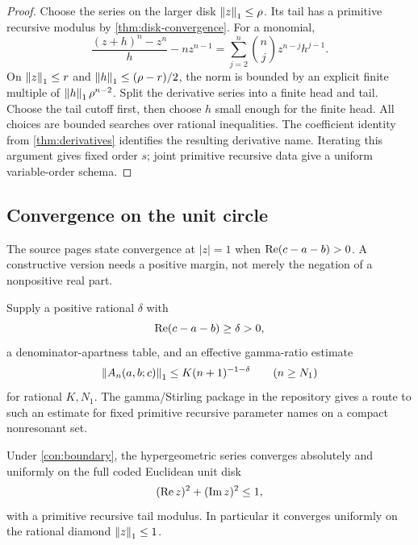 \begin{proof}
Choose the series on the larger disk \(\left\lVert z\right\rVert_1\le\rho\).  Its tail has a
primitive recursive modulus by \cref{thm:disk-convergence}.  For a monomial,
\[
 \frac{(z+h)^n-z^n}{h}-nz^{n-1}
 =\sum_{j=2}^{n}\binom nj z^{n-j}h^{j-1}.
\]
On \(\left\lVert z\right\rVert_1\le r\) and \(\left\lVert h\right\rVert_1\le(\rho-r)/2\), the norm is bounded by an
explicit finite multiple of \(\left\lVert h\right\rVert_1\rho^{n-2}\).  Split the derivative
series into a finite head and tail.  Choose the tail cutoff first, then choose
\(h\) small enough for the finite head.  All choices are bounded searches over
rational inequalities.  The coefficient identity from
\cref{thm:derivatives} identifies the resulting derivative name.  Iterating
this argument gives fixed order \(s\); joint primitive recursive data give a
uniform variable-order schema.
\end{proof}

\subsection{Convergence on the unit circle}

The source pages state convergence at \(|z|=1\) when
\(\operatorname{Re}(c-a-b)>0\).  A constructive version needs a positive margin, not
merely the negation of a nonpositive real part.

\begin{contract}\label{con:boundary}
Supply a positive rational \(\delta\) with
\[
 \operatorname{Re}(c-a-b)\ge\delta>0,
\]
a denominator-apartness table, and an effective gamma-ratio estimate
\begin{equation}\label{eq:gamma-ratio-contract}
 \left\lVert A_n(a,b;c)\right\rVert_1\le K(n+1)^{-1-\delta}
 \qquad(n\ge N_1)
\end{equation}
for rational \(K,N_1\).  The gamma/Stirling package in the repository gives a
route to such an estimate for fixed primitive recursive parameter names on a
compact nonresonant set.
\end{contract}

\begin{theorem}\label{thm:unit-circle}
Under \cref{con:boundary}, the hypergeometric series converges absolutely and
uniformly on the full coded Euclidean unit disk
\[
   (\operatorname{Re} z)^2+(\operatorname{Im} z)^2\le1,
\]
with a primitive recursive tail modulus.  In particular it converges
uniformly on the rational diamond \(\left\lVert z\right\rVert_1\le1\).
\end{theorem}

